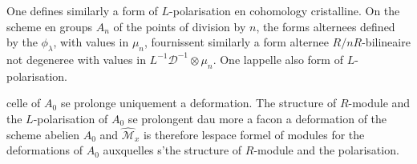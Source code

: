 \documentclass[11pt,a4paper]{article}
\theoremstyle{plain}
\theoremstyle{definition}
\begin{document}
One defines similarly a form of $L$-polarisation en cohomology cristalline.
On the scheme en groups $A_n$ of the points of division by $n$, the forms alternees
defined by the $\phi_\lambda$, with values in $\mu_n$, fournissent similarly a form alternee
$R/nR$-bilineaire not degeneree with values in $L^{-1}\mathscr{D}^{-1} \otimes \mu_n$. One lappelle also
form of $L$-polarisation.


celle of $A_0$ se prolonge uniquement a deformation. The structure of
$R$-module and the $L$-polarisation of $A_0$ se prolongent dau more a facon a
deformation of the scheme abelien $A_0$ and $\hat{\mathscr{M}}_x$ is therefore lespace formel of modules
for the deformations of $A_0$ auxquelles s'\etendent the structure of $R$-module and
the polarisation.

\subsection{}
\end{document}
